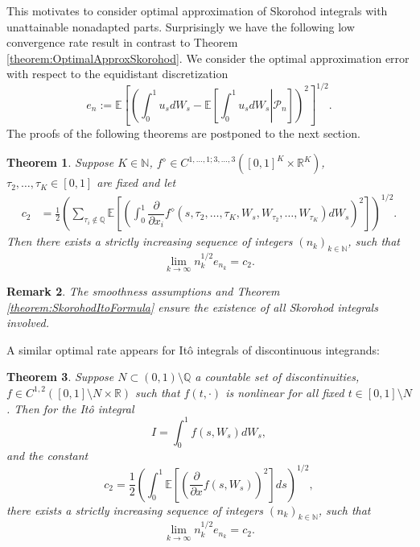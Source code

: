 \documentclass[a4paper,11pt,reqno]{amsart}
\theoremstyle{plain}
\newtheorem{theorem}{Theorem}
\newtheorem{remark}[theorem]{Remark}
\def\N{\mathbb{N}}
\def\Q{\mathbb{Q}}
\def\R{\mathbb{R}}
\def\ex{\mathbb{E}}
\numberwithin{equation}{section}
\begin{document}
This motivates to consider optimal approximation of Skorohod integrals with unattainable nonadapted parts. Surprisingly we have the following low convergence rate result in contrast to Theorem \ref{theorem:OptimalApproxSkorohod}. We consider the optimal approximation error with respect to the equidistant discretization
$$
e_{n} := \ex\left[\left(\int_{0}^{1} u_s dW_s - \ex\left[\left.\int_{0}^{1} u_s dW_s\right|\mathcal{P}_n\right]\right)^2\right]^{1/2}.
$$
The proofs of the following theorems are postponed to the next section.

\begin{theorem}\label{thm:OptApproxIrrational}
Suppose $K \in \N$, $f^{\diamond} \in C^{1,\ldots,1; 3,\ldots,3}([0,1]^K\times \R^{K})$,  $\tau_2, \ldots, \tau_K \in [0,1]$ are fixed and let
\begin{align*}
c_2 &= \frac{1}{2}  \left(\sum_{\tau_i \notin \Q}\ex\left[\left(\int_{0}^{1}\dfrac{\partial}{\partial x_i} f^{\diamond}(s,\tau_2, \ldots, \tau_K,W_{s}, W_{\tau_2}, \ldots, W_{\tau_K}) dW_s\right)^2\right]\right)^{1/2}.
\end{align*}
Then there exists a strictly increasing sequence of integers $(n_k)_{k \in \N}$, such that
\[
\lim_{k \rightarrow \infty} n_k^{1/2} e_{n_k} =c_2.
\]
\end{theorem}

\begin{remark}
The smoothness assumptions and Theorem \ref{theorem:SkorohodItoFormula} ensure the existence of all Skorohod integrals involved.
\end{remark}

A similar optimal rate appears for It\^o integrals of discontinuous integrands:

\begin{theorem}\label{theorem:MainTheoremIto}
Suppose $N \subset (0,1) \setminus \Q$ a countable set of discontinuities, $f \in C^{1,2}([0,1]\setminus N \times \R)$ such that $f(t,\cdot)$ is nonlinear for all fixed $t \in [0,1]\setminus N$. Then for the It\^o integral 
\[
I= \int_{0}^{1} f(s,W_s) dW_s,
\]
and the constant
\[
c_2 = \frac{1}{2}  \left(\int_{0}^{1}\ex\left[\left(\dfrac{\partial}{\partial x} f(s,W_{s})\right)^2\right]ds\right)^{1/2}, 
\]
there exists a strictly increasing sequence of integers $(n_k)_{k \in \N}$, such that
\[
\lim_{k \rightarrow \infty} n_k^{1/2} e_{n_k} = c_2.  
\]
\end{theorem}
\end{document}
